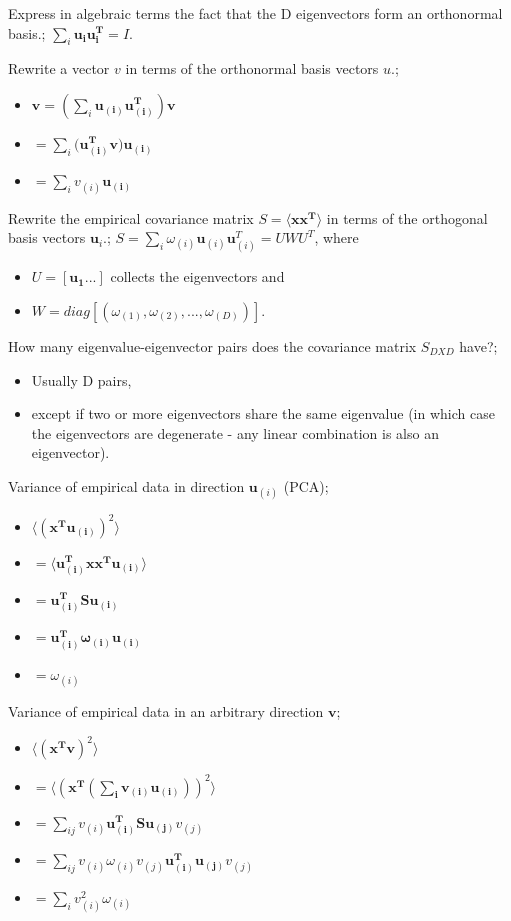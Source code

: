 \documentclass{article}
\begin{document}
Express in algebraic terms the fact that the D eigenvectors form an orthonormal basis.; $\sum_i\mathbf{u_{i}u_{i}^T}=I$.

Rewrite a vector $v$ in terms of the orthonormal basis vectors $u$.; \begin{itemize} \item $\mathbf{v}=(\sum_i \mathbf{u_{(i)}u_{(i)}^T})\mathbf{v}$ \item $=\sum_i (\mathbf{u_{(i)}^Tv)u_{(i)}}$ \item $=\sum_i v_{(i)}\mathbf{u_{(i)}}$ \end{itemize}

Rewrite the empirical covariance matrix $S=\langle \mathbf{xx^T} \rangle$ in terms of the orthogonal basis vectors $\mathbf{u}_i$.; $S=\sum_i \omega_{(i)}\mathbf{u}_{(i)}\mathbf{u}_{(i)}^T = UWU^T$, where \begin{itemize} \item $U=[\mathbf{u_{1}}...]$ collects the eigenvectors and \item $W = diag[(\omega_{(1)}, \omega_{(2)},...,\omega_{(D)})]$.  \end{itemize}

How many eigenvalue-eigenvector pairs does the covariance matrix $S_{DXD}$ have?; \begin{itemize} \item Usually D pairs, \item except if two or more eigenvectors share the same eigenvalue (in which case the eigenvectors are degenerate - any linear combination is also an eigenvector).  \end{itemize}

Variance of empirical data in direction $\mathbf{u}_{(i)}$ (PCA); \begin{itemize} \item $\langle (\mathbf{x^Tu_{(i)}})^2\rangle $ \item $= \langle \mathbf{u_{(i)}^Txx^Tu_{(i)}}\rangle $ \item $=\mathbf{u_{(i)}^TSu_{(i)}}$ \item $=\mathbf{u_{(i)}^T\omega_{(i)}u_{(i)}}$ \item $=\omega_{(i)}$ \end{itemize}

Variance of empirical data in an arbitrary direction $\mathbf{v}$; \begin{itemize} \item $\langle (\mathbf{x^Tv})^2\rangle $ \item $= \langle (\mathbf{x^T(\sum_i v_{(i)}\mathbf{u}_{(i)})})^2\rangle $ \item $=\sum_{ij}v_{(i)}\mathbf{u_{(i)}^TSu_{(j)}}v_{(j)}$ \item $=\sum_{ij}v_{(i)}\omega_{(i)}v_{(j)}\mathbf{u_{(i)}^Tu_{(j)}}v_{(j)}$ \item $=\sum_i v_{(i)}^2\omega_{(i)}$ \end{itemize}
\end{document}
